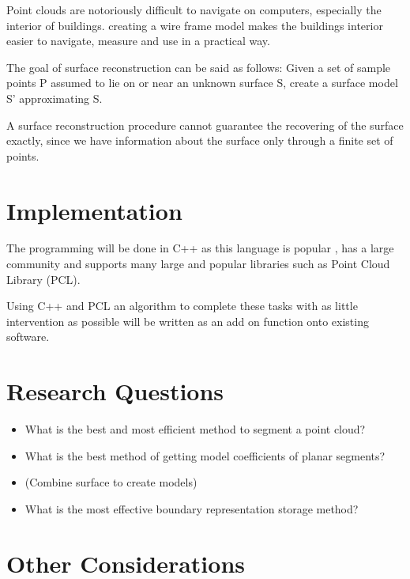Point clouds are notoriously difficult to navigate on computers, especially the interior of buildings. creating a wire frame model makes the buildings interior easier to navigate, measure and use in a practical way.

The goal of surface reconstruction can be said as follows: Given a set of sample points P assumed to lie on or near an unknown surface S, create a surface model S' approximating S.

A surface reconstruction procedure cannot guarantee the recovering of the surface exactly, since we have information about the surface only through a finite set of points.

\section{Implementation}



The programming will be done in C++ as this language is popular , has a large community and supports many large and popular libraries such as Point Cloud Library (PCL). 

Using C++ and PCL an algorithm to complete these tasks with as little intervention as possible will be written as an add on function onto existing software.




\section{Research Questions}
\begin{itemize}
	
	\item What is the best and most efficient method to segment a point cloud?
	
	\item What is the best method of getting model coefficients of planar segments?
	
	\item (Combine surface to create models)
	
	\item What is the most effective boundary representation storage method?
	
\end{itemize}


\section{Other Considerations}

